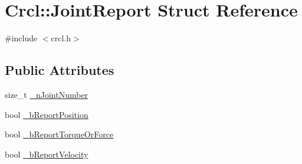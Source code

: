 \hypertarget{structCrcl_1_1JointReport}{\section{Crcl\-:\-:Joint\-Report Struct Reference}
\label{structCrcl_1_1JointReport}
}


{\ttfamily \#include $<$crcl.\-h$>$}

\subsection*{Public Attributes}
\begin{DoxyCompactItemize}
\item 
size\-\_\-t \hyperlink{structCrcl_1_1JointReport_ac49defefe1565597177b1363dec3eb66}{\-\_\-n\-Joint\-Number}
\item 
bool \hyperlink{structCrcl_1_1JointReport_a768a2ddefebd748006d8295f863a2faf}{\-\_\-b\-Report\-Position}
\item 
bool \hyperlink{structCrcl_1_1JointReport_a8688287259bf8e0619a6f4a06a3c5721}{\-\_\-b\-Report\-Torque\-Or\-Force}
\item 
bool \hyperlink{structCrcl_1_1JointReport_aea4383b9bb5263ec07cc151d574442c9}{\-\_\-b\-Report\-Velocity}
\end{DoxyCompactItemize}


